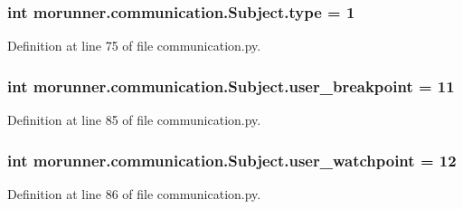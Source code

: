 \subsubsection[{type}]{\setlength{\rightskip}{0pt plus 5cm}int morunner.\+communication.\+Subject.\+type = 1\hspace{0.3cm}{\ttfamily [static]}}\label{classmorunner_1_1communication_1_1Subject_a14af2bb1b6e526ffdca900d719cbf169}


Definition at line 75 of file communication.\+py.

\hypertarget{classmorunner_1_1communication_1_1Subject_a1e3fcdc8be94d51e906d17e7c0235556}{}
\subsubsection[{user\+\_\+breakpoint}]{\setlength{\rightskip}{0pt plus 5cm}int morunner.\+communication.\+Subject.\+user\+\_\+breakpoint = 11\hspace{0.3cm}{\ttfamily [static]}}\label{classmorunner_1_1communication_1_1Subject_a1e3fcdc8be94d51e906d17e7c0235556}


Definition at line 85 of file communication.\+py.

\hypertarget{classmorunner_1_1communication_1_1Subject_abbc303b6440251f7eb90012d1d1e12b9}{}
\subsubsection[{user\+\_\+watchpoint}]{\setlength{\rightskip}{0pt plus 5cm}int morunner.\+communication.\+Subject.\+user\+\_\+watchpoint = 12\hspace{0.3cm}{\ttfamily [static]}}\label{classmorunner_1_1communication_1_1Subject_abbc303b6440251f7eb90012d1d1e12b9}


Definition at line 86 of file communication.\+py.

\hypertarget{classmorunner_1_1communication_1_1Subject_ab43ed6150da716dccc34f12e9ea60eb9}{}
